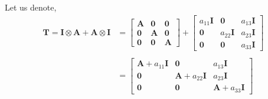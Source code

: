 \documentclass{article}
\begin{document}
Let us denote,
\begin{equation}
\begin{aligned}
\mathbf{T}=
\mathbf{I} \otimes \mathbf{A} + \mathbf{A} \otimes \mathbf{I} &=
\begin{bmatrix}
\mathbf{A} & \mathbf{0} & \mathbf{0} \\
\mathbf{0} & \mathbf{A} & \mathbf{0} \\
\mathbf{0} & \mathbf{0} & \mathbf{A}
\end{bmatrix}+
\begin{bmatrix}
a_{11}\mathbf{I} & \mathbf{0} & a_{13}\mathbf{I} \\
\mathbf{0} & a_{22}\mathbf{I} & a_{23}\mathbf{I} \\
\mathbf{0} & \mathbf{0} & a_{33}\mathbf{I}
\end{bmatrix} \\
\\
&=
\begin{bmatrix}
\mathbf{A}+a_{11}\mathbf{I} & \mathbf{0} & a_{13}\mathbf{I} \\
\mathbf{0} & \mathbf{A}+a_{22}\mathbf{I} & a_{23}\mathbf{I} \\
\mathbf{0} & \mathbf{0} & \mathbf{A}+a_{33}\mathbf{I}
\end{bmatrix}
\end{aligned}
\end{equation}
\end{document}
